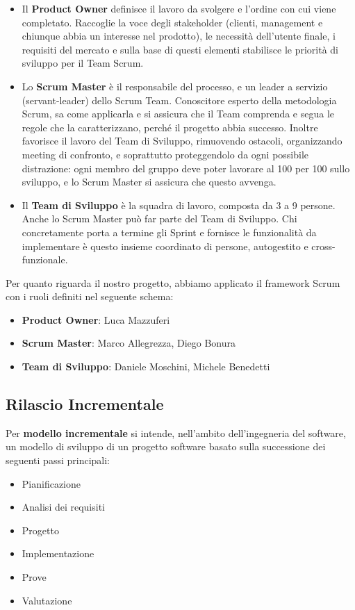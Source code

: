 \begin{itemize}
\item Il \textbf{Product Owner} definisce il lavoro da svolgere e l'ordine con cui viene completato. Raccoglie la voce degli stakeholder (clienti, management e chiunque abbia un interesse nel prodotto), le necessità dell'utente finale, i requisiti del mercato e sulla base di questi elementi stabilisce le priorità di sviluppo per il Team Scrum.
\item Lo \textbf{Scrum Master} è il responsabile del processo, e un leader a servizio (servant-leader) dello Scrum Team. Conoscitore esperto della metodologia Scrum, sa come applicarla e si assicura che il Team comprenda e segua le regole che la caratterizzano, perché il progetto abbia successo. Inoltre favorisce il lavoro del Team di Sviluppo, rimuovendo ostacoli, organizzando meeting di confronto, e soprattutto proteggendolo da ogni possibile distrazione: ogni membro del gruppo deve poter lavorare al 100 per 100 sullo sviluppo, e lo Scrum Master si assicura che questo avvenga.
\item Il \textbf{Team di Sviluppo} è la squadra di lavoro, composta da 3 a 9 persone. Anche lo Scrum Master può far parte del Team di Sviluppo. Chi concretamente porta a termine gli Sprint e fornisce le funzionalità da implementare è questo insieme coordinato di persone, autogestito e cross-funzionale.
\end{itemize}

Per quanto riguarda il nostro progetto, abbiamo applicato il framework Scrum con i ruoli definiti nel seguente schema:
\begin{itemize}
\item \textbf{Product Owner}: Luca Mazzuferi
\item \textbf{Scrum Master}: Marco Allegrezza, Diego Bonura
\item \textbf{Team di Sviluppo}: Daniele Moschini, Michele Benedetti
\end{itemize}

\newpage
\subsection{Rilascio Incrementale}

Per \textbf{modello incrementale} si intende, nell'ambito dell'ingegneria del software, un modello di sviluppo di un progetto software basato sulla successione dei seguenti passi principali:

\begin{itemize}
\item Pianificazione
\item Analisi dei requisiti
\item Progetto
\item Implementazione
\item Prove
\item Valutazione
\end{itemize}

